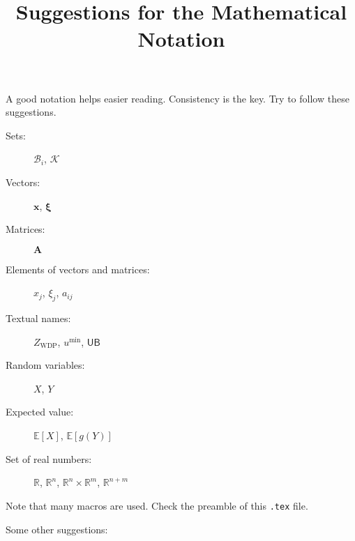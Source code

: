 \documentclass[letterpaper, 11pt]{article}
\title{Suggestions for the Mathematical Notation}
\author{}
\date{}
\renewcommand{\vec}[1]{\bm{#1}}
\newcommand{\mat}[1]{\bm{#1}}
\newcommand{\set}[1]{\mathcal{#1}}
\def\Eb{\mathbb{E}}
\def\Rb{\mathbb{R}}
\newenvironment{example}
 {\VerbatimOut{\jobname.tmp}}
 {\endVerbatimOut
 \begin{center}
 \fbox{
	 \begin{minipage}[c]{\textwidth}
	  
	 \end{minipage}
   }
 \fbox{
 	\begin{minipage}[c]{\textwidth}
	 
  	\end{minipage}
  }
  \end{center}
 }
\begin{document}
\maketitle

A good notation helps easier reading. Consistency is the key. Try to follow these suggestions. 
\begin{example}
\begin{description}
\item [Sets:] $\set{B}_i$, $\set{K}$
\item [Vectors:] $\vec{x}$, $\vec{\xi}$
\item [Matrices:] $\mat{A}$
\item [Elements of vectors and matrices:] $x_j$, $\xi_j$, $a_{ij}$
\item [Textual names:] $Z_{\text{WDP}}$, $u^{\min}$, $\mathsf{UB}$
\item [Random variables:] $X$, $Y$
\item [Expected value:] $\Eb[X]$, $\Eb[g(Y)]$
\item [Set of real numbers:] $\Rb$, $\Rb^n$, $\Rb^n \times \Rb^m$, $\Rb^{n+m}$
\end{description}
\end{example}

Note that many macros are used. Check the preamble of this \texttt{.tex} file.

Some other suggestions:
\end{document}
